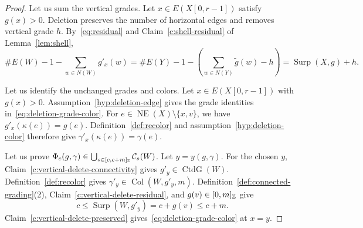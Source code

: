 \begin{proof}
 Let us sum the vertical grades.
Let $x\in E(X[0,r-1])$ satisfy $g(x)>0$.
Deletion preserves the number of horizontal edges and removes vertical grade $h$.
By~\eqref{eq:residual} and Claim~\ref{c:shell-residual} of Lemma~\ref{lem:shell},
\[
 \#E(W)-1-\sum_{w\in N(W)}g'_x(w)
 =\#E(Y)-1-\left(\sum_{w\in N(Y)}\widetilde g(w)-h\right)
 =\operatorname{Surp}(X,g)+h.
\]

 Let us identify the unchanged grades and colors.
Let $x\in E(X[0,r-1])$ with $g(x)>0$.
Assumption~\ref{hyp:deletion-edge} gives the grade identities
in~\eqref{eq:deletion-grade-color}.
For $e\in\operatorname{NE}(X)\setminus\{x,v\}$, we have
$g'_x(\kappa(e))=g(e)$.
Definition~\ref{def:recolor} and assumption~\ref{hyp:deletion-color}
therefore give $\gamma'_x(\kappa(e))=\gamma(e)$.

 Let us prove
$\Phi_c(g,\gamma)\in\bigcup_{s\in[c,c+m]_{\mathbb Z}}\mathcal C_s(W)$.
Let $y=y(g,\gamma)$.
For the chosen $y$, Claim~\ref{c:vertical-delete-connectivity} gives
$g'_y\in\operatorname{CtdG}(W)$.
Definition~\ref{def:recolor} gives $\gamma'_y\in\operatorname{Col}(W,g'_y,m)$.
Definition~\ref{def:connected-grading}(2), Claim~\ref{c:vertical-delete-residual}, and $g(v)\in[0,m]_{\mathbb Z}$ give
\[
 c\le\operatorname{Surp}(W,g'_y)=c+g(v)\le c+m.
\]
Claim~\ref{c:vertical-delete-preserved} gives~\eqref{eq:deletion-grade-color} at $x=y$.
\end{proof}

